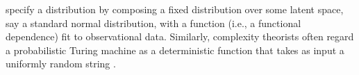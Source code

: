     specify a distribution
    by composing a fixed
    distribution
    over some latent space,
    say a standard normal distribution,
    with a function (i.e., a functional dependence) fit to observational data.
Similarly, complexity theorists often regard
    a probabilistic Turing machine as a deterministic function
    that takes as input a uniformly random string \citep{probTuring}.
%
